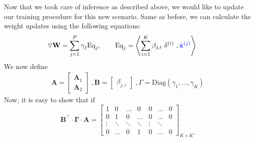 Now that we took care of inference as described above, we would like to update our training procedure for this new scenario. Same as before, we can calculate the weight updates using the following equations:
\begin{equation}\label{eq:gamma_lin_colluding}
\triangledown \mathbf{W} = \sum_{j=1}^{P}  \gamma_{j} \text{Eq}_{j}, \qquad \text{Eq}_{j} = \left\langle \sum_{i=1}^K \beta_{j,i}~ \mathbf \delta^{(i)}~,{\color{blue}\bar{\mathbf x}^{(j)}} \right\rangle~\quad~
\end{equation}
We now define
\begin{align}
    \mathbf A=\begin{bmatrix}
    \mathbf A_1\\
    \mathbf A_2
    \end{bmatrix}~, \mathbf B=\begin{bmatrix}
    \beta_{j,i}
    \end{bmatrix}~, \Gamma=\text{Diag}(\gamma_1,\dots,\gamma_K)
\end{align}
Now, it is easy to show that if 
\begin{equation}
    \mathbf B^\intercal\cdot \mathbf \Gamma\cdot \mathbf A = \begin{bmatrix}1 & 0 & \dots & 0 & 0 & \dots & 0
  \\0 & 1 & 0 & \dots & 0 & \dots & 0
  \\\vdots & \ddots& \ddots & \ddots & \vdots & \ddots  
\\ 0 & \dots & 0 & 1 & 0 &\dots & 0\end{bmatrix}_{K \times K'}
\label{eq:matrix_relation}
\end{equation}

